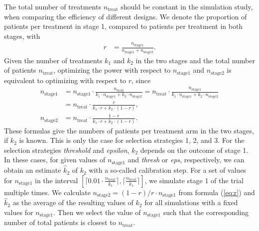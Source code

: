 \documentclass[bimj,fleqn]{w-art}
\theoremstyle{plain}
\theoremstyle{definition}
\begin{document}
The total number of treatments $n_{\text{treat}}$ should be constant in the simulation study, when comparing the efficiency of different designs.
We denote the proportion of patients per treatment in stage 1, compared to patients per treatment in both stages, with 
\begin{align}
  \label{eq:r}
 r & = \frac{n_{\text{stage1}}}{n_{\text{stage1}}+n_{\text{stage2}}}.
\end{align}
Given the number of treatments $k_1$ and $k_2$ in the two stages and the total number of patients $n_{\text{treat}}$, optimizing the power with respect to $n_{\text{stage1}}$ and $n_{\text{stage2}}$ is equivalent to optimizing with respect to $r$, since
\begin{align}
  \label{eq:stagec}
  n_{\text{stage1}} & = 
  n_{\text{stage1}}\cdot \frac{n_{\text{treat}}}{k_1\cdot n_{\text{stage1}}+k_2\cdot n_{\text{stage2}}} = 
  n_{\text{treat}} \cdot \frac{n_{\text{stage1}}}{k_1\cdot n_{\text{stage1}}+k_2\cdot n_{\text{stage2}}} \nonumber \\
  & = n_{\text{treat}}\cdot
  \frac{r}{k_1\cdot
  r+k_2\cdot (1-r)}, \nonumber \\
  n_{\text{stage2}} & =
  n_{\text{treat}}\cdot
  \frac{1-r}{k_1\cdot
  r+k_2\cdot (1-r)}.
\end{align}
These formulas give the numbers of patients per treatment arm in the two stages, if $k_2$ is known. 
This is only the case for selection strategies 1, 2, and 3.
For the selection strategies \emph{threshold} and \emph{epsilon}, $k_2$ depends on the outcome of stage 1.
In these cases, for given values of $n_{\text{stage1}}$ and \emph{thresh} or \emph{eps}, respectively, we can  obtain an estimate $\hat{k}_2$ of $k_2$ with a so-called calibration step.
For a set of values for $n_{\text{stage1}}$ in the interval $\left[ \lceil 0.01 \cdot \frac{n_{\text{treat}}}{k_1} \rceil, \lceil \frac{n_{\text{treat}}}{k_1} \rceil \right]$, we simulate stage 1 of the trial multiple times.
We calculate $n_{\text{stage2}} = (1-r)/r\cdot n_{\text{stage1}}$ from formula (\ref{eq:r}) and $\hat{k}_2$ as the average of the resulting values of $k_2$ for all simulations with a fixed values for $n_{\text{stage1}}$.
Then we select the value of $n_{\text{stage1}}$ such that the corresponding number of total patients is closest to $n_{\text{treat}}$.
\end{document}
